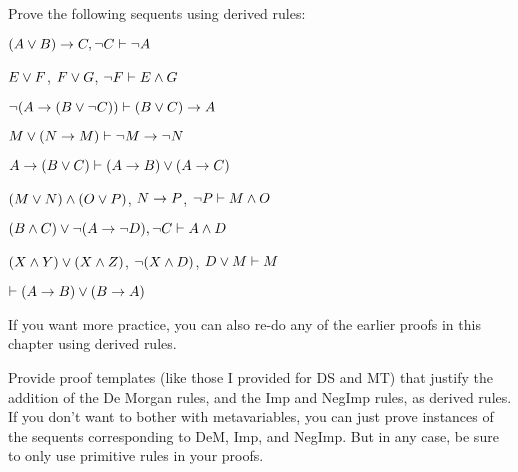 \problempart
Prove the following sequents using derived rules:
\begin{earg}
\item $(A \vee B) \rightarrow C , \neg C \vdash \neg A$
\item $E\vee F$, $F\vee G$, $\neg F \vdash E \wedge G$
\item $\neg (A \rightarrow (B \vee \neg C)) \vdash (B \vee C) \rightarrow A$
\item $M\vee(N\rightarrow M)  \vdash  \neg M \rightarrow \neg N$
\item $A \rightarrow (B \vee C) \vdash (A \rightarrow B) \vee (A \rightarrow C)$
\item $(M \vee N) \wedge (O \vee P)$, $N \rightarrow P$, $\neg P  \vdash  M\wedge O$
\item $(B \wedge C) \vee \neg (A \rightarrow \neg D), \neg C \vdash A \wedge D$
\item $(X\wedge Y)\vee(X\wedge Z)$, $\neg(X\wedge D)$, $D\vee M  \vdash  M$
\item $\vdash (A \rightarrow B) \vee (B \rightarrow A)$
\end{earg}
If you want more practice, you can also re-do any of the earlier proofs in this chapter using derived rules.

\problempart
Provide proof templates (like those I provided for DS and MT) that justify the addition of the De Morgan rules, and the Imp and NegImp rules, as derived rules. If you don't want to bother with metavariables, you can just prove instances of the sequents corresponding to DeM, Imp, and NegImp.  But in any case, be sure to only use primitive rules in your proofs.

